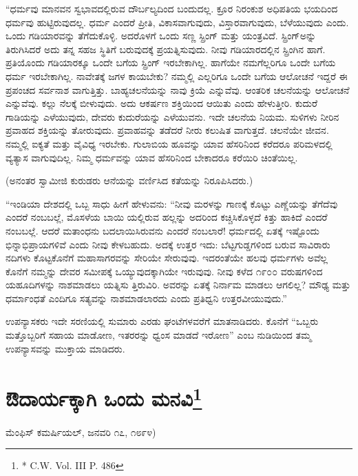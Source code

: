 “ಧರ್ಮವು ಮಾನವನ ಸ್ವಭಾವದಲ್ಲಿರುವ ದೌರ್ಬಲ್ಯದಿಂದ ಬಂದುದಲ್ಲ. ಕ್ರೂರ ನಿರಂಕುಶ ಅಧಿಪತಿಯ ಭಯದಿಂದ ಧರ್ಮವು ಹುಟ್ಟಿರುವುದಲ್ಲ. ಧರ್ಮ ಎಂದರೆ ಪ್ರೀತಿ, ವಿಕಾಸವಾಗುವುದು, ವಿಸ್ತಾರವಾಗುವುದು, ಬೆಳೆಯುವುದು ಎಂದು. ಒಂದು ಗಡಿಯಾರವನ್ನು ತೆಗೆದುಕೊಳ್ಳಿ. ಅದರೊಳಗೆ ಒಂದು ಸಣ್ಣ ಸ್ಪ್ರಿಂಗ್​ ಮತ್ತು ಯಂತ್ರವಿದೆ. ಸ್ಪ್ರಿಂಗ್​ ಅನ್ನು ತಿರುಗಿಸಿದರೆ ಅದು ತನ್ನ ಸಹಜ ಸ್ಥಿತಿಗೆ ಬರುವುದಕ್ಕೆ ಪ್ರಯತ್ನಿಸುವುದು. ನೀವು ಗಡಿಯಾರದಲ್ಲಿನ ಸ್ಪ್ರಿಂಗಿನ ಹಾಗೆ. ಪ್ರತಿಯೊಂದು ಗಡಿಯಾರಕ್ಕೂ ಒಂದೇ ಬಗೆಯ ಸ್ಪ್ರಿಂಗ್​ ಇರಬೇಕಾಗಿಲ್ಲ. ಹಾಗೆಯೇ ನಮಗೆಲ್ಲರಿಗೂ ಒಂದೇ ಬಗೆಯ ಧರ್ಮ ಇರಬೇಕಾಗಿಲ್ಲ. ನಾವೇತಕ್ಕೆ ಜಗಳ ಕಾಯಬೇಕು? ನಮ್ಮಲ್ಲಿ ಎಲ್ಲರಿಗೂ ಒಂದೇ ಬಗೆಯ ಆಲೋಚನೆ ಇದ್ದರೆ ಈ ಪ್ರಪಂಚದ ಸರ್ವನಾಶ ವಾಗುತ್ತಿತ್ತು. ಬಾಹ್ಯಚಲನೆಯನ್ನು ನಾವು ಕ್ರಿಯೆ ಎನ್ನುವೆವು. ಆಂತರಿಕ ಚಲನೆಯನ್ನು ಆಲೋಚನೆ ಎನ್ನುವೆವು. ಕಲ್ಲು ನೆಲಕ್ಕೆ ಬೀಳುವುದು. ಅದು ಆಕರ್ಷಣ ಶಕ್ತಿಯಿಂದ ಆಯಿತು ಎಂದು ಹೇಳುತ್ತೀರಿ. ಕುದುರೆ ಗಾಡಿಯನ್ನು ಎಳೆಯುವುದು, ದೇವರು ಕುದುರೆಯನ್ನು ಎಳೆಯುವನು. ಇದೇ ಚಲನೆಯ ನಿಯಮ. ಸುಳಿಗಳು ನೀರಿನ ಪ್ರವಾಹದ ಶಕ್ತಿಯನ್ನು ತೋರುವುದು. ಪ್ರವಾಹವನ್ನು ತಡೆದರೆ ನೀರು ಕಲುಷಿತ ವಾಗುತ್ತದೆ. ಚಲನೆಯೇ ಜೀವನ. ನಮ್ಮಲ್ಲಿ ಐಕ್ಯತೆ ಮತ್ತು ವೈವಿಧ್ಯ ಇರಬೇಕು. ಗುಲಾಬಿಯ ಹೂವನ್ನು ಯಾವ ಹೆಸರಿನಿಂದ ಕರೆದರೂ ಪರಿಮಳದಲ್ಲಿ ವ್ಯತ್ಯಾಸ ವಾಗುವುದಿಲ್ಲ. ನಿಮ್ಮ ಧರ್ಮವನ್ನು ಯಾವ ಹೆಸರಿನಿಂದ ಬೇಕಾದರೂ ಕರೆಯಿರಿ ಚಿಂತೆಯಿಲ್ಲ.

(ಅನಂತರ ಸ್ವಾಮೀಜಿ ಕುರುಡರು ಆನೆಯನ್ನು ವರ್ಣಿಸಿದ ಕತೆಯನ್ನು ನಿರೂಪಿಸಿದರು.)

“ಇಂಡಿಯಾ ದೇಶದಲ್ಲಿ ಒಬ್ಬ ಸಾಧು ಹೀಗೆ ಹೇಳುವನು: “ನೀವು ಮರಳನ್ನು ಗಾಣಕ್ಕೆ ಕೊಟ್ಟು ಎಣ್ಣೆಯನ್ನು ತೆಗೆದೆವು ಎಂದರೆ ನಂಬಬಲ್ಲೆ, ಮೊಸಳೆಯ ಬಾಯಿ ಯಲ್ಲಿರುವ ಹಲ್ಲನ್ನು ಅದರಿಂದ ಕಚ್ಚಿಸಿಕೊಳ್ಳದೆ ಕಿತ್ತು ಹಾಕಿದೆ ಎಂದರೆ ನಂಬಬಲ್ಲೆ. ಆದರೆ ಮತಾಂಧನು ಬದಲಾಯಿಸಿರುವನು ಎಂದರೆ ನಂಬಲಾರೆ! ಧರ್ಮದಲ್ಲಿ ಏತಕ್ಕೆ ಇಷ್ಟೊಂದು ಭಿನ್ನಾಭಿಪ್ರಾಯಗಳಿವೆ ಎಂದು ನೀವು ಕೇಳಬಹುದು. ಅದಕ್ಕೆ ಉತ್ತರ ಇದು: ಬೆಟ್ಟಗುಡ್ಡಗಳಿಂದ ಬರುವ ಸಾವಿರಾರು ನದಿಗಳು ಕೊಟ್ಟಕೊನೆಗೆ ಮಹಾಸಾಗರವನ್ನು ಸೇರಿಯೇ ಸೇರುವುವು. ಇದರಂತೆಯೇ ಹಲವು ಧರ್ಮಗಳು ಅವೆಲ್ಲ ಕೊನೆಗೆ ನಮ್ಮನ್ನು ದೇವರ ಸಮೀಪಕ್ಕೆ ಒಯ್ಯುವುದಕ್ಕಾಗಿಯೇ ಇರುವುವು. ನೀವು ಕಳೆದ ೧೯೦೦ ವರುಷಗಳಿಂದ ಯಹೂದಿಗಳನ್ನು ನಾಶಮಾಡಲು ಯತ್ನಿಸು ತ್ತಿರುವಿರಿ. ಅವರನ್ನು ಏತಕ್ಕೆ ನಿರ್ನಾಮ ಮಾಡಲು ಆಗಲಿಲ್ಲ? ಮೌಢ್ಯ ಮತ್ತು ಧರ್ಮಾಂಧತೆ ಎಂದಿಗೂ ಸತ್ಯವನ್ನು ನಾಶಮಾಡಲಾರದು ಎಂದು ಪ್ರತಿಧ್ವನಿ ಉತ್ತರವೀಯುವುದು.”

ಉಪನ್ಯಾಸಕರು ಇದೇ ಸರಣಿಯಲ್ಲಿ ಸುಮಾರು ಎರಡು ಘಂಟೆಗಳವರೆಗೆ ಮಾತನಾಡಿದರು. ಕೊನೆಗೆ “ಒಬ್ಬರು ಮತ್ತೊಬ್ಬರಿಗೆ ಸಹಾಯ ಮಾಡೋಣ, ಇತರರನ್ನು ಧ್ವಂಸ ಮಾಡದೆ ಇರೋಣ” ಎಂಬ ನುಡಿಯಿಂದ ತಮ್ಮ ಉಪನ್ಯಾಸವನ್ನು ಮುಕ್ತಾಯ ಮಾಡಿದರು.

\delimiter


\section{ಔದಾರ್ಯಕ್ಕಾಗಿ ಒಂದು ಮನವಿ\protect\footnote{* C.W. Vol. III P. 486}}

\begin{center}
ಮೆಂಫಿಸ್​ ಕಮರ್ಷಿಯಲ್​, ಜನವರಿ ೧೭, ೧೮೯೪)
\end{center}

